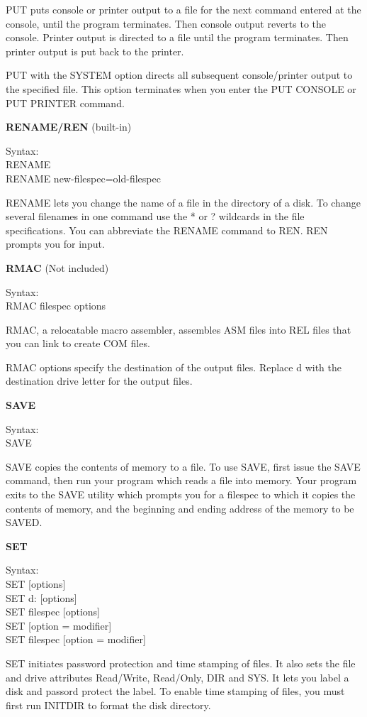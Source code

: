 PUT puts console or printer output to a file for the next command
entered at the console, until the program terminates. Then console
output reverts to the console. Printer output is directed to a file
until the program terminates. Then printer output is put back to the
printer.

PUT with the SYSTEM option directs all subsequent console/printer
output to the specified file.  This option terminates when you enter
the PUT CONSOLE or PUT PRINTER command.

\textbf{RENAME/REN} (built-in)

\hangindent=0.7cm Syntax:\\
RENAME\\
RENAME new-filespec=old-filespec

RENAME lets you change the name of a file in the directory of a
disk. To change several filenames in one command use the * or ?
wildcards in the file specifications. You can abbreviate the RENAME
command to REN. REN prompts you for input.

\textbf{RMAC} (Not included)

\hangindent=0.7cm Syntax:\\
RMAC filespec {options}

RMAC, a relocatable macro assembler, assembles ASM files into REL
files that you can link to create COM files.

RMAC options specify the destination of the output files. Replace d
with the destination drive letter for the output files.

\textbf{SAVE}

\hangindent=0.7cm Syntax:\\
SAVE

SAVE copies the contents of memory to a file. To use SAVE, first issue
the SAVE command, then run your program which reads a file into
memory. Your program exits to the SAVE utility which prompts you for a
filespec to which it copies the contents of memory, and the beginning
and ending address of the memory to be SAVED.

\textbf{SET}

\hangindent=0.7cm Syntax:\\
SET [options]\\
SET d: [options]\\
SET filespec [options]\\
SET [option = modifier]\\
SET filespec [option = modifier]

SET initiates password protection and time stamping of files. It also
sets the file and drive attributes Read/Write, Read/Only, DIR and
SYS. It lets you label a disk and passord protect the label. To enable
time stamping of files, you must first run INITDIR to format the disk
directory.

